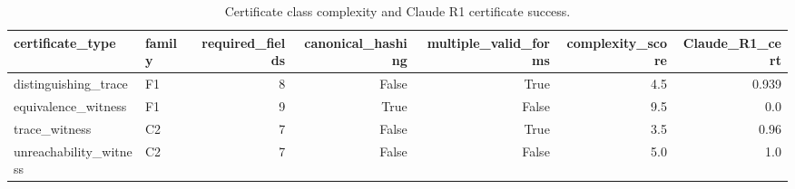 \begin{table}[t]
\centering
\caption{Certificate class complexity and Claude R1 certificate success.}
\label{tab:cert-complexity}
\begin{tabular}{llrrrrr}
\toprule
certificate\_type & family & required\_fields & canonical\_hashing & multiple\_valid\_forms & complexity\_score & Claude\_R1\_cert \\
\midrule
distinguishing\_trace & F1 & 8 & False & True & 4.5 & 0.939 \\
equivalence\_witness & F1 & 9 & True & False & 9.5 & 0.0 \\
trace\_witness & C2 & 7 & False & True & 3.5 & 0.96 \\
unreachability\_witness & C2 & 7 & False & False & 5.0 & 1.0 \\
\bottomrule
\end{tabular}
\end{table}